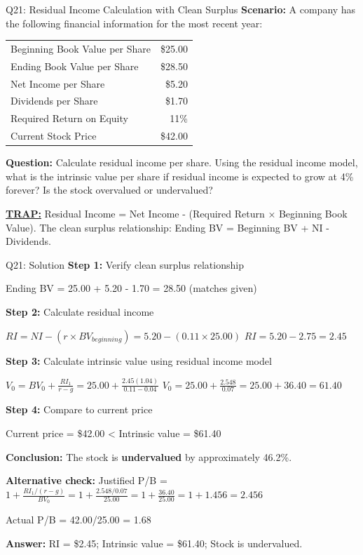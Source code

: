 \documentclass{beamer}
\renewcommand{\scriptsize}{\fontsize{6pt}{7pt}\selectfont}
\begin{document}
	\begin{frame}{Q21: Residual Income Calculation with Clean Surplus}
		\scriptsize
		\textbf{Scenario:} A company has the following financial information for the most recent year:
		
		\begin{tabular}{lr}
			Beginning Book Value per Share & \$25.00 \\
			Ending Book Value per Share & \$28.50 \\
			Net Income per Share & \$5.20 \\
			Dividends per Share & \$1.70 \\
			Required Return on Equity & 11\% \\
			Current Stock Price & \$42.00 \\
		\end{tabular}
		
		\textbf{Question:} Calculate residual income per share. Using the residual income model, what is the intrinsic value per share if residual income is expected to grow at 4\% forever? Is the stock overvalued or undervalued?
		
		\vspace{2pt}
		\underline{\textbf{TRAP:}} Residual Income = Net Income - (Required Return × Beginning Book Value). The clean surplus relationship: Ending BV = Beginning BV + NI - Dividends.
	\end{frame}
	
	\begin{frame}{Q21: Solution}
		\scriptsize
		\textbf{Step 1:} Verify clean surplus relationship
		
		Ending BV = 25.00 + 5.20 - 1.70 = 28.50  (matches given)
		
		\vspace{2pt}
		\textbf{Step 2:} Calculate residual income
		
		$RI = NI - (r \times BV_{beginning}) = 5.20 - (0.11 \times 25.00)$
		$RI = 5.20 - 2.75 = 2.45$
		
		\vspace{2pt}
		\textbf{Step 3:} Calculate intrinsic value using residual income model
		
		$V_0 = BV_0 + \frac{RI_1}{r - g} = 25.00 + \frac{2.45(1.04)}{0.11 - 0.04}$
		$V_0 = 25.00 + \frac{2.548}{0.07} = 25.00 + 36.40 = 61.40$
		
		\vspace{2pt}
		\textbf{Step 4:} Compare to current price
		
		Current price = \$42.00 < Intrinsic value = \$61.40
		
		\vspace{2pt}
		\textbf{Conclusion:} The stock is \textbf{undervalued} by approximately 46.2\%.
		
		\vspace{2pt}
		\textbf{Alternative check:}
		Justified P/B = $1 + \frac{RI_1/(r-g)}{BV_0} = 1 + \frac{2.548/0.07}{25.00} = 1 + \frac{36.40}{25.00} = 1 + 1.456 = 2.456$
		
		Actual P/B = 42.00/25.00 = 1.68
		
		\textbf{Answer:} RI = \$2.45; Intrinsic value = \$61.40; Stock is undervalued.
	\end{frame}
	
\end{document}
